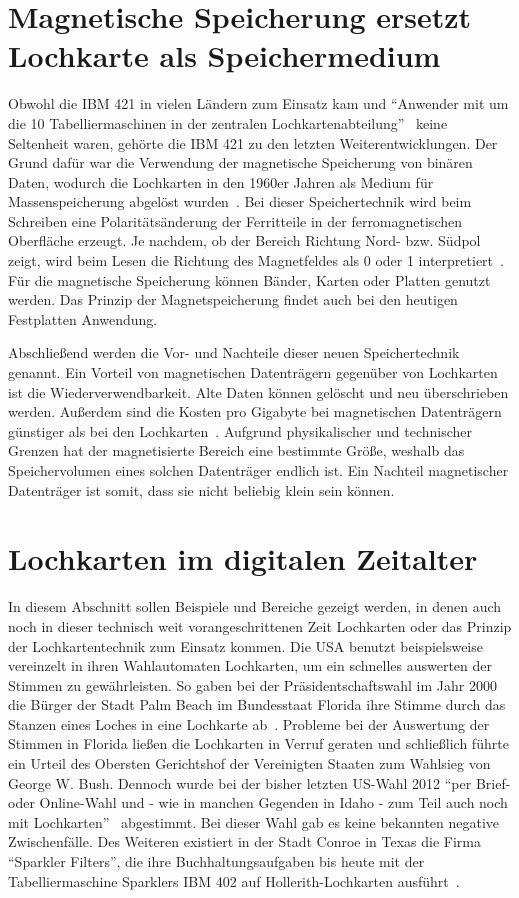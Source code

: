 \documentclass[parskip=half]{scrartcl}
\begin{document}
\section{Magnetische Speicherung ersetzt Lochkarte als Speichermedium}

Obwohl die IBM 421 in vielen Ländern zum Einsatz kam und \enquote{Anwender mit
um die 10 Tabelliermaschinen in der zentralen
Lochkartenabteilung}~\cite{sandner} keine Seltenheit waren, gehörte die IBM 421
zu den letzten Weiterentwicklungen. Der Grund dafür war die Verwendung der
magnetische Speicherung von binären Daten, wodurch die Lochkarten in den 1960er
Jahren als Medium für Massenspeicherung abgelöst wurden~\cite{gronau2009}. Bei
dieser Speichertechnik wird beim Schreiben eine Polaritätsänderung der
Ferritteile in der  ferromagnetischen Oberfläche erzeugt. Je nachdem, ob der
Bereich Richtung Nord- bzw. Südpol zeigt, wird beim Lesen die Richtung des
Magnetfeldes als 0 oder 1 interpretiert~\cite{gronau2009}. Für die magnetische
Speicherung können Bänder, Karten oder Platten genutzt werden. Das Prinzip der
Magnetspeicherung findet auch bei den heutigen Festplatten Anwendung.

Abschließend werden die Vor- und Nachteile dieser neuen Speichertechnik
genannt. Ein Vorteil von magnetischen Datenträgern gegenüber von Lochkarten ist
die Wiederverwendbarkeit. Alte Daten können gelöscht und neu überschrieben
werden. Außerdem sind die Kosten pro Gigabyte bei magnetischen Datenträgern
günstiger als bei den Lochkarten~\cite{Dee}. Aufgrund physikalischer und
technischer Grenzen hat der magnetisierte Bereich eine bestimmte Größe, weshalb
das Speichervolumen eines solchen Datenträger endlich ist. Ein Nachteil
magnetischer Datenträger ist somit, dass sie nicht beliebig klein sein können.

\section{Lochkarten im digitalen Zeitalter}

In diesem Abschnitt sollen Beispiele und Bereiche gezeigt werden, in denen auch
noch in dieser technisch weit vorangeschrittenen Zeit Lochkarten oder das
Prinzip der Lochkartentechnik zum Einsatz kommen. Die USA benutzt
beispielsweise vereinzelt in ihren Wahlautomaten Lochkarten, um ein schnelles
auswerten der Stimmen zu gewährleisten. So gaben bei der Präsidentschaftswahl
im Jahr 2000 die Bürger der Stadt Palm Beach im Bundesstaat Florida ihre Stimme
durch das Stanzen eines Loches in eine Lochkarte ab~\cite{simons}. Probleme bei
der Auswertung der Stimmen in Florida ließen die Lochkarten in Verruf geraten
und schließlich führte ein Urteil des Obersten Gerichtshof der Vereinigten
Staaten zum Wahlsieg von George W. Bush. Dennoch wurde bei der bisher letzten
US-Wahl 2012 \enquote{per Brief- oder Online-Wahl und - wie in manchen Gegenden
in Idaho - zum Teil auch noch mit Lochkarten}~\cite{keinVerfasser} abgestimmt.
Bei dieser Wahl gab es keine bekannten negative Zwischenfälle. Des Weiteren
existiert in der Stadt Conroe in Texas die Firma \enquote{Sparkler Filters},
die ihre Buchhaltungsaufgaben bis heute mit der Tabelliermaschine Sparklers IBM
402 auf Hollerith-Lochkarten ausführt~\cite{edwards}.
\end{document}

